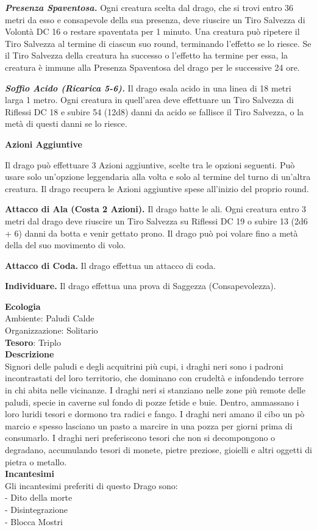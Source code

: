 \begin{multicols}{2}
\textit{\textbf{Presenza Spaventosa.}} Ogni creatura scelta dal drago, che si trovi entro 36 metri da esso e consapevole della sua presenza, deve riuscire un Tiro Salvezza di Volontà DC 16 o restare spaventata per 1 minuto. Una creatura può ripetere il Tiro Salvezza al termine di ciascun suo round, terminando l'effetto se lo riesce. Se il Tiro Salvezza della creatura ha successo o l'effetto ha termine per essa, la creatura è immune alla Presenza Spaventosa del drago per le successive 24 ore.

\textit{\textbf{Soffio Acido (Ricarica 5-6).}} Il drago esala acido in una linea di 18 metri larga 1 metro. Ogni creatura in quell'area deve effettuare un Tiro Salvezza di Riflessi DC 18 e subire 54 (12d8) danni da acido se fallisce il Tiro Salvezza, o la metà di questi danni se lo
riesce.

\textbf{Azioni Aggiuntive}

Il drago può effettuare 3 Azioni aggiuntive, scelte tra le opzioni seguenti. Può usare solo un'opzione leggendaria alla volta e solo al termine del turno di un'altra creatura. Il drago recupera le Azioni aggiuntive spese all'inizio del proprio round.

\textbf{Attacco di Ala (Costa 2 Azioni).} Il drago batte le ali. Ogni creatura entro 3 metri dal drago deve riuscire un Tiro Salvezza su Riflessi DC 19 o subire 13 (2d6 + 6) danni da botta e venir gettato prono. Il drago può poi volare fino a metà della del suo movimento di volo.

\textbf{Attacco di Coda.} Il drago effettua un attacco di coda.

\textbf{Individuare.} Il drago effettua una prova di Saggezza (Consapevolezza).

\textbf{Ecologia}\\
Ambiente: Paludi Calde\\
Organizzazione: Solitario\\
\textbf{Tesoro}: Triplo\\
\textbf{Descrizione}\\
Signori delle paludi e degli acquitrini più cupi, i draghi neri sono i padroni incontrastati del loro territorio, che dominano con crudeltà e infondendo terrore in chi abita nelle vicinanze. I draghi neri si stanziano nelle zone più remote delle paludi, specie in caverne sul fondo di pozze fetide e buie. Dentro, ammassano i loro luridi tesori e dormono tra radici e fango. I draghi neri amano il cibo un pò marcio e spesso lasciano un pasto a marcire in una pozza per giorni prima di consumarlo. I draghi neri preferiscono tesori che non si decompongono o degradano, accumulando tesori di monete, pietre preziose, gioielli e altri oggetti di pietra o metallo.\\
\textbf{Incantesimi}\\
Gli incantesimi preferiti di questo Drago sono:\\
- Dito della morte\\
- Disintegrazione\\
- Blocca Mostri



\end{multicols}
